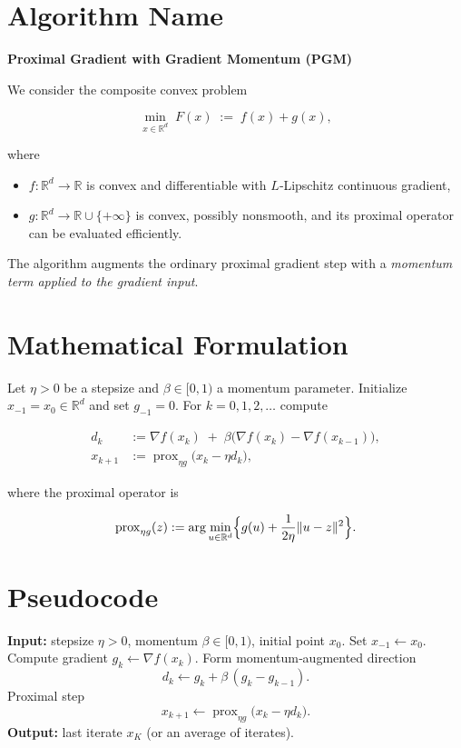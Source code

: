\documentclass{article}
\begin{document}
\section*{Algorithm Name}
\textbf{Proximal Gradient with Gradient Momentum (PGM)}  

We consider the composite convex problem  

\[
\min_{x\in\mathbb{R}^d}\;F(x)\;:=\;f(x)+g(x),
\]

where  

\begin{itemize}
    \item $f:\mathbb{R}^d\!\to\!\mathbb{R}$ is convex and differentiable with $L$‑Lipschitz continuous gradient,
    \item $g:\mathbb{R}^d\!\to\!\mathbb{R}\cup\{+\infty\}$ is convex, possibly nonsmooth, and its proximal operator can be evaluated efficiently.
\end{itemize}

The algorithm augments the ordinary proximal gradient step with a \emph{momentum term applied to the gradient input}.

\section*{Mathematical Formulation}
Let $\eta>0$ be a stepsize and $\beta\in[0,1)$ a momentum parameter.  
Initialize $x_{-1}=x_{0}\in\mathbb{R}^d$ and set $g_{-1}=0$.  
For $k=0,1,2,\dots$ compute  

\[
\boxed{
\begin{aligned}
d_k &:= \nabla f(x_k) \;+\; \beta\bigl(\nabla f(x_k)-\nabla f(x_{k-1})\bigr), \tag{1}\\[4pt]
x_{k+1} &:= \operatorname{prox}_{\eta g}\!\bigl(x_k-\eta d_k\bigr), \tag{2}
\end{aligned}}
\]

where the proximal operator is  

\[
\operatorname{prox}_{\eta g}(z):=\arg\min_{u\in\mathbb{R}^d}\Bigl\{ g(u)+\frac{1}{2\eta}\|u-z\|^2\Bigr\}.
\]

\section*{Pseudocode}
\begin{algorithm}[H]
\caption{Proximal Gradient with Gradient Momentum (PGM)}
\begin{algorithmic}[1]
\STATE \textbf{Input:} stepsize $\eta>0$, momentum $\beta\in[0,1)$, initial point $x_0$.
\STATE Set $x_{-1}\leftarrow x_0$.
    \STATE Compute gradient $g_k \leftarrow \nabla f(x_k)$.
    \STATE Form momentum‑augmented direction 
    \[
    d_k \leftarrow g_k+\beta\,(g_k-g_{k-1}) .
    \]
    \STATE Proximal step 
    \[
    x_{k+1}\leftarrow \operatorname{prox}_{\eta g}\bigl(x_k-\eta d_k\bigr).
    \]
\ENDFOR
\STATE \textbf{Output:} last iterate $x_{K}$ (or an average of iterates).
\end{algorithmic}
\end{algorithm}
\end{document}
